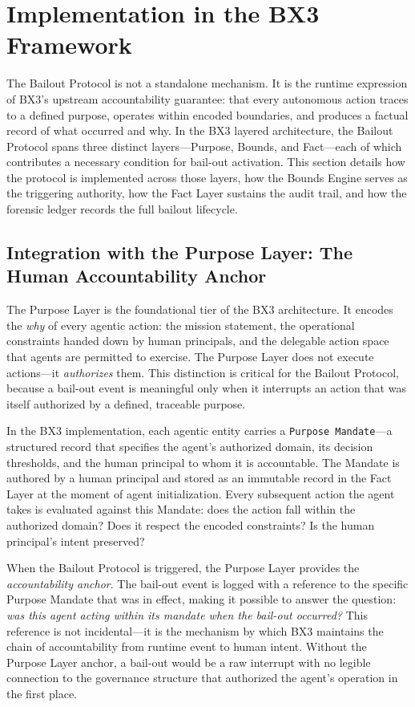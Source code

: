 \section{Implementation in the BX3 Framework}
\label{section:bailout-implementation}

The Bailout Protocol is not a standalone mechanism. It is the runtime expression of BX3's upstream accountability guarantee: that every autonomous action traces to a defined purpose, operates within encoded boundaries, and produces a factual record of what occurred and why. In the BX3 layered architecture, the Bailout Protocol spans three distinct layers—Purpose, Bounds, and Fact—each of which contributes a necessary condition for bail-out activation. This section details how the protocol is implemented across those layers, how the Bounds Engine serves as the triggering authority, how the Fact Layer sustains the audit trail, and how the forensic ledger records the full bailout lifecycle.

\subsection{Integration with the Purpose Layer: The Human Accountability Anchor}
\label{subsection:bailout-purpose-layer}

The Purpose Layer is the foundational tier of the BX3 architecture. It encodes the \textit{why} of every agentic action: the mission statement, the operational constraints handed down by human principals, and the delegable action space that agents are permitted to exercise. The Purpose Layer does not execute actions—it \textit{authorizes} them. This distinction is critical for the Bailout Protocol, because a bail-out event is meaningful only when it interrupts an action that was itself authorized by a defined, traceable purpose.

In the BX3 implementation, each agentic entity carries a \texttt{Purpose Mandate}—a structured record that specifies the agent's authorized domain, its decision thresholds, and the human principal to whom it is accountable. The Mandate is authored by a human principal and stored as an immutable record in the Fact Layer at the moment of agent initialization. Every subsequent action the agent takes is evaluated against this Mandate: does the action fall within the authorized domain? Does it respect the encoded constraints? Is the human principal's intent preserved?

When the Bailout Protocol is triggered, the Purpose Layer provides the \textit{accountability anchor}. The bail-out event is logged with a reference to the specific Purpose Mandate that was in effect, making it possible to answer the question: \textit{was this agent acting within its mandate when the bail-out occurred?} This reference is not incidental—it is the mechanism by which BX3 maintains the chain of accountability from runtime event to human intent. Without the Purpose Layer anchor, a bail-out would be a raw interrupt with no legible connection to the governance structure that authorized the agent's operation in the first place.

